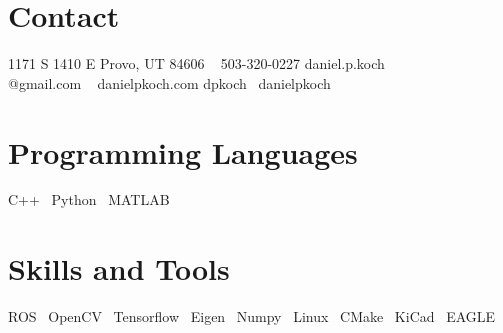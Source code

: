 
\begin{aside}
\section{Contact}
1171 S 1410 E
Provo, UT 84606
~
503-320-0227
daniel.p.koch\\@gmail.com
~
danielpkoch.com
dpkoch~\github
danielpkoch~\linkedin
~
%
\section{Programming Languages}
C++~\cpp
Python~\python
MATLAB~\matlab
%
\section{Skills and Tools}
ROS~\ros
OpenCV~\opencv
Tensorflow~\tensorflow
Eigen~\eigen
Numpy~\numpy
Linux~\linux
CMake~\cmake
KiCad~\kicad
EAGLE~\eagle
%
\end{aside}